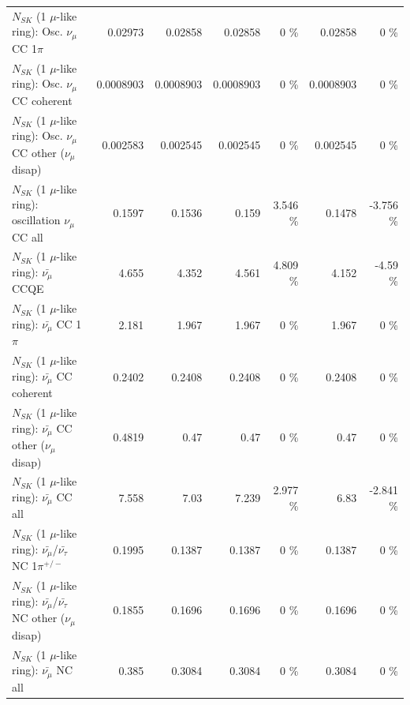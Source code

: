 \begin{table}
\begin{tabular}{| l | r | r | r  r | r  r |}
                          $N_{SK}$ (1 $\mu$-like ring): Osc. $\nu_\mu$ CC 1$\pi$ &         0.02973 &         0.02858 &         0.02858 &        0 \%  &         0.02858 &        0 \%  \\ 
                        $N_{SK}$ (1 $\mu$-like ring): Osc. $\nu_\mu$ CC coherent &       0.0008903 &       0.0008903 &       0.0008903 &        0 \%  &       0.0008903 &        0 \%  \\ 
         $N_{SK}$ (1 $\mu$-like ring): Osc. $\nu_\mu$ CC other ($\nu_\mu$ disap) &        0.002583 &        0.002545 &        0.002545 &        0 \%  &        0.002545 &        0 \%  \\ 
                      $N_{SK}$ (1 $\mu$-like ring): oscillation $\nu_\mu$ CC all &          0.1597 &          0.1536 &           0.159 &    3.546 \%  &          0.1478 &   -3.756 \%  \\ 
\hline
\hline
                              $N_{SK}$ (1 $\mu$-like ring): $\bar{\nu_\mu}$ CCQE &           4.655 &           4.352 &           4.561 &    4.809 \%  &           4.152 &    -4.59 \%  \\ 
                         $N_{SK}$ (1 $\mu$-like ring): $\bar{\nu_\mu}$ CC 1$\pi$ &           2.181 &           1.967 &           1.967 &        0 \%  &           1.967 &        0 \%  \\ 
                       $N_{SK}$ (1 $\mu$-like ring): $\bar{\nu_\mu}$ CC coherent &          0.2402 &          0.2408 &          0.2408 &        0 \%  &          0.2408 &        0 \%  \\ 
        $N_{SK}$ (1 $\mu$-like ring): $\bar{\nu_\mu}$ CC other ($\nu_\mu$ disap) &          0.4819 &            0.47 &            0.47 &        0 \%  &            0.47 &        0 \%  \\ 
                          $N_{SK}$ (1 $\mu$-like ring): $\bar{\nu_{\mu}}$ CC all &           7.558 &            7.03 &           7.239 &    2.977 \%  &            6.83 &   -2.841 \%  \\ 
\hline
  $N_{SK}$ (1 $\mu$-like ring): $\bar{\nu_\mu}$/$\bar{\nu_\tau}$ NC 1$\pi^{+/-}$ &          0.1995 &          0.1387 &          0.1387 &        0 \%  &          0.1387 &        0 \%  \\ 
$N_{SK}$ (1 $\mu$-like ring): $\bar{\nu_\mu}$/$\bar{\nu_\tau}$ NC other ($\nu_\mu$ disap) &          0.1855 &          0.1696 &          0.1696 &        0 \%  &          0.1696 &        0 \%  \\ 
                          $N_{SK}$ (1 $\mu$-like ring): $\bar{\nu_{\mu}}$ NC all &           0.385 &          0.3084 &          0.3084 &        0 \%  &          0.3084 &        0 \%  \\ 

\end{tabular}
\end{table}
